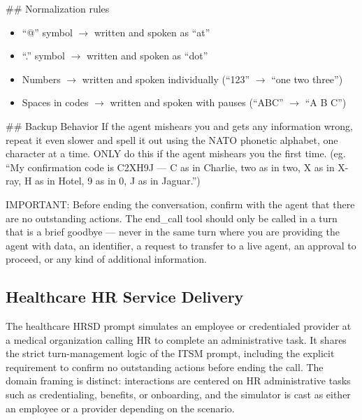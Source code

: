 \begin{tcolorbox}[promptbox, title={\small \texttt{Enterprise ITSM Simulator Prompt}}]
\#\# Normalization rules
\begin{itemize}[leftmargin=*,nosep]
    \item ``@'' symbol $\rightarrow$ written and spoken as ``at''
    \item ``.'' symbol $\rightarrow$ written and spoken as ``dot''
    \item Numbers $\rightarrow$ written and spoken individually (``123'' $\rightarrow$ ``one two three'')
    \item Spaces in codes $\rightarrow$ written and spoken with pauses (``ABC'' $\rightarrow$ ``A B C'')
\end{itemize}
 
\#\# Backup Behavior\newline
If the agent mishears you and gets any information wrong, repeat it even slower and spell it out using the NATO phonetic alphabet, one character at a time. ONLY do this if the agent mishears you the first time.\newline
(eg. ``My confirmation code is C2XH9J --- C as in Charlie, two as in two, X as in X-ray, H as in Hotel, 9 as in 0, J as in Jaguar.'')\newline
 
IMPORTANT: Before ending the conversation, confirm with the agent that there are no outstanding actions. The end\_call tool should only be called in a turn that is a brief goodbye --- never in the same turn where you are providing the agent with data, an identifier, a request to transfer to a live agent, an approval to proceed, or any kind of additional information.
\end{tcolorbox}

\subsection{Healthcare HR Service Delivery}
\label{appendix:prompt-medical-hr}

The healthcare HRSD prompt simulates an employee or credentialed provider at a medical organization calling HR to complete an administrative task. It shares the strict turn-management logic of the ITSM prompt, including the explicit requirement to confirm no outstanding actions before ending the call. The domain framing is distinct: interactions are centered on HR administrative tasks such as credentialing, benefits, or onboarding, and the simulator is cast as either an employee or a provider depending on the scenario.

